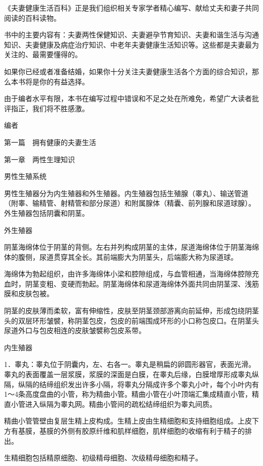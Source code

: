 \documentclass[12pt,UTF8]{ctexbook}
\begin{document}
《夫妻健康生活百科》正是我们组织相关专家学者精心编写、献给丈夫和妻子共同阅读的百科读物。

书中的主要内容有：夫妻两性保健知识、夫妻避孕节育知识、夫妻和谐生活与沟通知识、夫妻健康及病症治疗知识、中老年夫妻健康生活知识等。这些都是夫妻最为关注的、最需要懂得的。

如果你已经或者准备结婚，如果你十分关注夫妻健康生活各个方面的综合知识，那么本书将是你的有益选择。

由于编者水平有限，本书在编写过程中错误和不足之处在所难免，希望广大读者批评指正，我们将不胜感激。

编者





第一篇　拥有健康的夫妻生活





第一章　两性生理知识


男性生殖系统


男性生殖器分为内生殖器和外生殖器。内生殖器包括生殖腺（睾丸）、输送管道（附睾、输精管、射精管和部分尿道）和附属腺体（精囊、前列腺和尿道球腺）。外生殖器包括阴囊和阴茎。

外生殖器

阴茎海绵体位于阴茎的背侧。左右并列构成阴茎的主体，尿道海绵体位于阴茎海绵体的腹侧，尿道贯穿其全长。其前端膨大为阴茎头，后端膨大称为尿道球。

海绵体为勃起组织，由许多海绵体小梁和腔隙组成，与血管相通，当海绵体腔隙充血时，阴茎变粗、变硬而勃起。阴茎海绵体和尿道海绵体外面共同由阴茎深、浅筋膜和皮肤包被。

阴茎的皮肤薄而柔软，富有伸缩性，皮肤至阴茎颈部游离向前延伸，形成包绕阴茎头的双层环形皱襞，称阴茎包皮，包皮的前端围成环形的小口称包皮口。在阴茎头尿道外口与包皮相连的皮肤皱襞称包皮系带。

内生殖器

1．睾丸：睾丸位于阴囊内，左、右各一。睾丸是稍扁的卵圆形器官，表面光滑。睾丸的表面覆盖一层浆膜，浆膜的深面是白膜，在睾丸后缘，白膜增厚形成睾丸纵隔，纵隔的结缔组织发出许多小隔，将睾丸分隔成许多个睾丸小叶，每个小叶内有1～4条高度盘曲的小管，称为精曲小管。精曲小管在小叶顶端汇集成精直小管，精直小管进入纵隔为睾丸网。精曲小管间的疏松结缔组织为睾丸间质。

精曲小管管壁由复层生精上皮构成。生精上皮由生精细胞和支持细胞组成。上皮下方有基膜，基膜的外侧有胶原纤维和肌样细胞，肌样细胞的收缩有利于精子的排出。

生精细胞包括精原细胞、初级精母细胞、次级精母细胞和精子。
\end{document}

